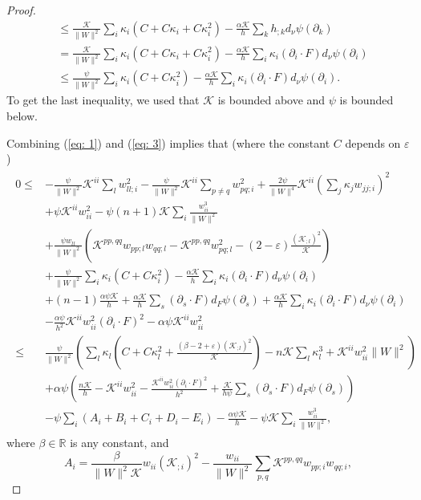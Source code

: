 \documentclass{amsart}
\theoremstyle{definition}
\theoremstyle{remark}
\numberwithin{equation}{section}
\begin{document}
\begin{proof}
\begin{align}
&\leq \frac{\mathcal{K}}{\|W\|^2}\sum_i \kappa_i(C+C\kappa_i+C\kappa_i^2)-\frac{\alpha\mathcal{K}}{h} \sum_k h_{;k} d_{\nu}\psi(\partial_k)\nonumber\\
&=\frac{\mathcal{K}}{\|W\|^2}\sum_i \kappa_i(C+C\kappa_i+C\kappa_i^2)-\frac{\alpha\mathcal{K}}{h}\sum_i \kappa_i(\partial_i\cdot F) d_{\nu}\psi(\partial_i)\nonumber\\
&\leq \frac{\psi}{\|W\|^2}\sum_i \kappa_i(C+C\kappa_i^2)-\frac{\alpha\mathcal{K}}{h}\sum_i \kappa_i(\partial_i\cdot F) d_{\nu}\psi(\partial_i).
\end{align}
To get the last inequality, we used that $\mathcal{K}$ is bounded above and $\psi$ is bounded below.

Combining  (\ref{eq: 1}) and (\ref{eq: 3}) implies that (where the constant $C$ depends on $\varepsilon$)
\begin{align}\begin{split}\label{eq:L10-1}
0\leq& -\frac{\psi}{\|W\|^2}\mathcal{K}^{ii}\sum_lw_{ll;i}^2-\frac{\psi}{\|W\|^2}\mathcal{K}^{ii}\sum_{p\ne q}w_{pq;i}^2
+\frac{2\psi}{\|W\|^4}\mathcal{K}^{ii}\left(\sum_j\kappa_jw_{jj;i}\right)^2\\
&+\psi\mathcal{K}^{ii}w_{ii}^2-\psi(n+1)\mathcal{K}\sum_i\frac{w_{ii}^3}{\|W\|^2}\\
&+\frac{\psi w_{ll}}{\|W\|^2}\left(\mathcal{K}^{pp,qq}w_{pp;l}w_{qq;l}-\mathcal{K}^{pp,qq}w_{pq;l}^2
-(2-\varepsilon)\frac{(\mathcal{K}_{;l})^2}{\mathcal{K}}\right)\\
&+\frac{\psi}{\|W\|^2}\sum_i \kappa_i(C+C\kappa_i^2)-\frac{\alpha\mathcal{K}}{h}\sum_i \kappa_i(\partial_i\cdot F) d_{\nu}\psi(\partial_i)\\
&+(n-1)\frac{\alpha\psi\mathcal{K}}{h}+\frac{\alpha\mathcal{K}}{h}\sum_s(\partial_s\cdot F) d_F\psi(\partial_s)+\frac{\alpha\mathcal{K}}{h}\sum_i\kappa_i(\partial_i\cdot F) d_{\nu}\psi(\partial_i)\\
&-\frac{\alpha\psi}{h^2}\mathcal{K}^{ii}w_{ii}^2(\partial_i\cdot F)^2 -\alpha\psi\mathcal{K}^{ii}w_{ii}^2\\
\leq&\frac{\psi}{\|W\|^2}\left(\sum_l\kappa_l\left(C+C\kappa_l^2+\frac{(\beta
-2+\varepsilon)(\mathcal{K}_{;l})^2}{\mathcal{K}}\right)-n\mathcal{K}\sum_l\kappa_l^3+\mathcal{K}^{ii}w_{ii}^2\|W\|^2\right)\\
&+\alpha\psi\left(\frac{n\mathcal{K}}{h}-\mathcal{K}^{ii}w_{ii}^2-\frac{\mathcal{K}^{ii}w_{ii}^2(\partial_i\cdot F)^2}{h^2}+\frac{\mathcal{K}}{h\psi}\sum_s(\partial_s\cdot F) d_F\psi(\partial_s)\right)\\
&-\psi\sum_i\left(A_i+B_i+C_i+D_i-E_i\right)
-\frac{\alpha\psi\mathcal{K}}{h}-\psi\mathcal{K}\sum_i\frac{w_{ii}^3}{\|W\|^2},
\end{split}\end{align}
where $\beta \in \mathbb{R}$ is any constant, and
\[A_i=\frac{\beta}{\|W\|^2\mathcal{K}} w_{ii}(\mathcal{K}_{;i})^2-\frac{w_{ii}}{\|W\|^2}\sum_{p,q}\mathcal{K}^{pp,qq}w_{pp;i}w_{qq;i},\]


\end{proof}
\end{document}
